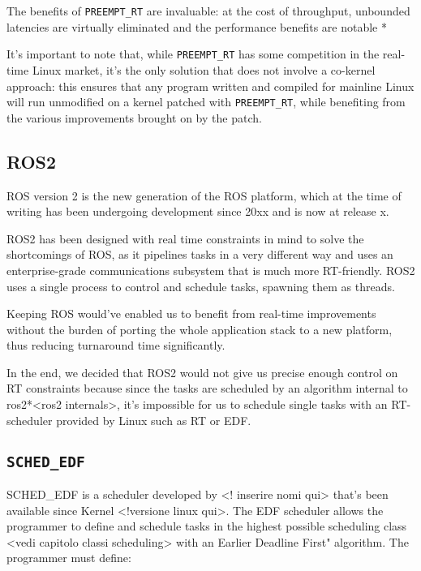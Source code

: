 \documentclass[a4paper,12pt]{report}
\begin{document}
The benefits of \texttt{PREEMPT\_RT}  are invaluable: at the cost of throughput, unbounded latencies are virtually eliminated and the performance benefits are notable *

It's important to note that, while \texttt{PREEMPT\_RT} has some competition in the real-time Linux market, it's the only solution that does not involve a co-kernel approach: this ensures that any program written and compiled for mainline Linux will run unmodified on a kernel patched with \texttt{PREEMPT\_RT}, while benefiting from the various improvements brought on by the patch.   

\subsection{ROS2}

ROS version 2 is the new generation of the ROS platform, which at the time of writing has been undergoing development since 20xx and is now at release x.

ROS2 has been designed with real time constraints in mind to solve the shortcomings of ROS, as it pipelines tasks in a very different way and uses an enterprise-grade communications subsystem that is much more RT-friendly. ROS2 uses a single process to control and schedule tasks, spawning them as threads.

Keeping ROS would've enabled us to benefit from real-time improvements without the burden of porting the whole application stack to a new platform, thus reducing turnaround time significantly. 

In the end, we decided that ROS2 would not give us precise enough control on RT constraints because since the tasks are scheduled by an algorithm internal to ros2*<ros2 internals>, it's impossible for us to schedule single tasks with an RT-scheduler provided by Linux such as RT or EDF. 

\subsection{\texttt{SCHED\_EDF}}

SCHED\_EDF is a scheduler developed by <! inserire nomi qui> that's been available since Kernel <!versione linux qui>. The EDF scheduler allows the programmer to define and schedule tasks in the highest possible scheduling class <vedi capitolo classi scheduling> with an Earlier Deadline First" algorithm. The programmer must define:
\end{document}

